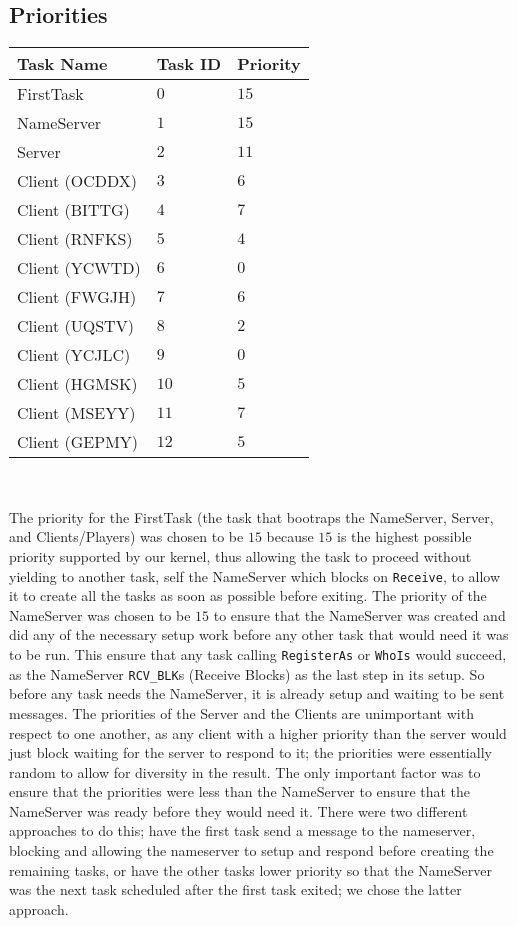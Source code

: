 \documentclass[12pt]{article}
\begin{document}
\subsection{Priorities}
\begin{center}
  \begin{tabular}{|l|l|l|}
    \hline
    Task Name & Task ID & Priority \\\hline
    FirstTask       & $0$  & $15$ \\\hline
    NameServer      & $1$  & $15$ \\\hline
    Server          & $2$  & $11$ \\\hline
    Client (OCDDX)  & $3$  & $6$ \\\hline
    Client (BITTG)  & $4$  & $7$ \\\hline
    Client (RNFKS)  & $5$  & $4$ \\\hline
    Client (YCWTD)  & $6$  & $0$ \\\hline
    Client (FWGJH)  & $7$  & $6$ \\\hline
    Client (UQSTV)  & $8$  & $2$ \\\hline
    Client (YCJLC)  & $9$  & $0$ \\\hline
    Client (HGMSK)  & $10$ & $5$ \\\hline
    Client (MSEYY)  & $11$ & $7$ \\\hline
    Client (GEPMY)  & $12$ & $5$ \\\hline
  \end{tabular}
  \\
\end{center}
The priority for the FirstTask (the task that bootraps the NameServer, Server, and Clients/Players) was chosen to be $15$ because $15$ is the highest possible priority supported by our kernel, thus allowing the task to proceed without yielding to another task, self the NameServer which blocks on \texttt{Receive}, to allow it to create all the tasks as soon as possible before exiting.  The priority of the NameServer was chosen to be $15$ to ensure that the NameServer was created and did any of the necessary setup work before any other task that would need it was to be run.  This ensure that any task calling \texttt{RegisterAs} or \texttt{WhoIs} would succeed, as the NameServer \texttt{RCV_BLK}s (Receive Blocks) as the last step in its setup.  So before any task needs the NameServer, it is already setup and waiting to be sent messages.  The priorities of the Server and the Clients are unimportant with respect to one another, as any client with a higher priority than the server would just block waiting for the server to respond to it; the priorities were essentially random to allow for diversity in the result.  The only important factor was to ensure that the priorities were less than the NameServer to ensure that the NameServer was ready before they would need it.  There were two different approaches to do this; have the first task send a message to the nameserver, blocking and allowing the nameserver to setup and respond before creating the remaining tasks, or have the other tasks lower priority so that the NameServer was the next task scheduled after the first task exited; we chose the latter approach.
\\[1\baselineskip]
\end{document}
